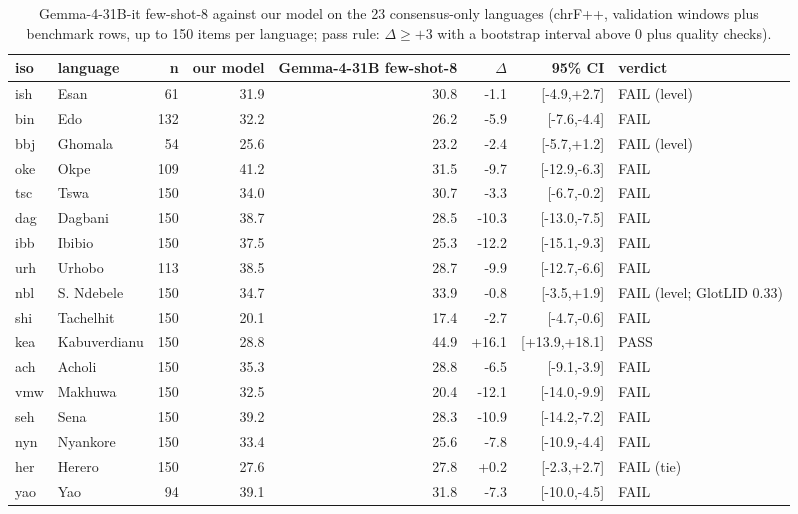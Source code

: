 \begin{table}[t]
\centering
\footnotesize
\setlength{\tabcolsep}{3pt}
\caption{Gemma-4-31B-it few-shot-8 against our model on the 23 consensus-only languages (chrF++, validation windows plus benchmark rows, up to 150 items per language; pass rule: \(\Delta \ge +3\) with a bootstrap interval above 0 plus quality checks).}
\label{tab:t_gemma31b}
\begin{adjustbox}{max width=\linewidth}
{\def\LTcaptype{none} %
\begin{tabular}{@{}llrrrrrl@{}}
\toprule
iso & language & n & our model & Gemma-4-31B few-shot-8 & \(\Delta\) & 95\% CI & verdict \\
\midrule
ish & Esan & 61 & 31.9 & 30.8 & -1.1 & {[}-4.9,+2.7{]} & FAIL (level) \\
bin & Edo & 132 & 32.2 & 26.2 & -5.9 & {[}-7.6,-4.4{]} & FAIL \\
bbj & Ghomala & 54 & 25.6 & 23.2 & -2.4 & {[}-5.7,+1.2{]} & FAIL (level) \\
oke & Okpe & 109 & 41.2 & 31.5 & -9.7 & {[}-12.9,-6.3{]} & FAIL \\
tsc & Tswa & 150 & 34.0 & 30.7 & -3.3 & {[}-6.7,-0.2{]} & FAIL \\
dag & Dagbani & 150 & 38.7 & 28.5 & -10.3 & {[}-13.0,-7.5{]} & FAIL \\
ibb & Ibibio & 150 & 37.5 & 25.3 & -12.2 & {[}-15.1,-9.3{]} & FAIL \\
urh & Urhobo & 113 & 38.5 & 28.7 & -9.9 & {[}-12.7,-6.6{]} & FAIL \\
nbl & S. Ndebele & 150 & 34.7 & 33.9 & -0.8 & {[}-3.5,+1.9{]} & FAIL (level; GlotLID 0.33) \\
shi & Tachelhit & 150 & 20.1 & 17.4 & -2.7 & {[}-4.7,-0.6{]} & FAIL \\
kea & Kabuverdianu & 150 & 28.8 & 44.9 & +16.1 & {[}+13.9,+18.1{]} & PASS \\
ach & Acholi & 150 & 35.3 & 28.8 & -6.5 & {[}-9.1,-3.9{]} & FAIL \\
vmw & Makhuwa & 150 & 32.5 & 20.4 & -12.1 & {[}-14.0,-9.9{]} & FAIL \\
seh & Sena & 150 & 39.2 & 28.3 & -10.9 & {[}-14.2,-7.2{]} & FAIL \\
nyn & Nyankore & 150 & 33.4 & 25.6 & -7.8 & {[}-10.9,-4.4{]} & FAIL \\
her & Herero & 150 & 27.6 & 27.8 & +0.2 & {[}-2.3,+2.7{]} & FAIL (tie) \\
yao & Yao & 94 & 39.1 & 31.8 & -7.3 & {[}-10.0,-4.5{]} & FAIL \\

\end{tabular}}
\end{adjustbox}
\end{table}
